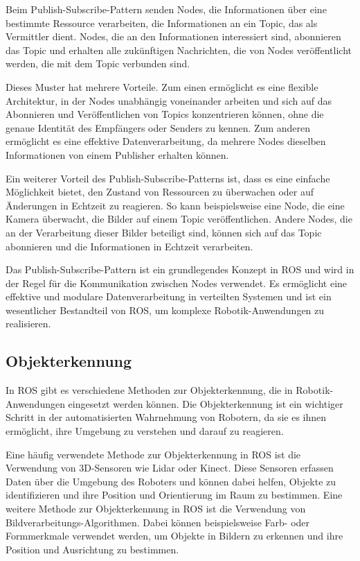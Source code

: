     Beim Publish-Subscribe-Pattern senden Nodes, die Informationen über eine bestimmte Ressource verarbeiten, die Informationen an ein Topic, das als Vermittler dient. Nodes, die an den Informationen interessiert sind, abonnieren das Topic und erhalten alle zukünftigen Nachrichten, die von Nodes veröffentlicht werden, die mit dem Topic verbunden sind.

    Dieses Muster hat mehrere Vorteile. Zum einen ermöglicht es eine flexible Architektur, in der Nodes unabhängig voneinander arbeiten und sich auf das Abonnieren und Veröffentlichen von Topics konzentrieren können, ohne die genaue Identität des Empfängers oder Senders zu kennen. Zum anderen ermöglicht es eine effektive Datenverarbeitung, da mehrere Nodes dieselben Informationen von einem Publisher erhalten können.

    Ein weiterer Vorteil des Publish-Subscribe-Patterns ist, dass es eine einfache Möglichkeit bietet, den Zustand von Ressourcen zu überwachen oder auf Änderungen in Echtzeit zu reagieren. So kann beispielsweise eine Node, die eine Kamera überwacht, die Bilder auf einem Topic veröffentlichen. Andere Nodes, die an der Verarbeitung dieser Bilder beteiligt sind, können sich auf das Topic abonnieren und die Informationen in Echtzeit verarbeiten.

    Das Publish-Subscribe-Pattern ist ein grundlegendes Konzept in \ac{ROS} und wird in der Regel für die Kommunikation zwischen Nodes verwendet. Es ermöglicht eine effektive und modulare Datenverarbeitung in verteilten Systemen und ist ein wesentlicher Bestandteil von \ac{ROS}, um komplexe Robotik-Anwendungen zu realisieren.

    \subsection{Objekterkennung} \label{objekterkennung:subsection}
    In \ac{ROS} gibt es verschiedene Methoden zur Objekterkennung, die in Robotik-Anwendungen eingesetzt werden können. Die Objekterkennung ist ein wichtiger Schritt in der automatisierten Wahrnehmung von Robotern, da sie es ihnen ermöglicht, ihre Umgebung zu verstehen und darauf zu reagieren.

    Eine häufig verwendete Methode zur Objekterkennung in \ac{ROS} ist die Verwendung von 3D-Sensoren wie Lidar oder Kinect. Diese Sensoren erfassen Daten über die Umgebung des Roboters und können dabei helfen, Objekte zu identifizieren und ihre Position und Orientierung im Raum zu bestimmen.
    Eine weitere Methode zur Objekterkennung in \ac{ROS} ist die Verwendung von Bildverarbeitungs-Algorithmen. Dabei können beispielsweise Farb- oder Formmerkmale verwendet werden, um Objekte in Bildern zu erkennen und ihre Position und Ausrichtung zu bestimmen.


